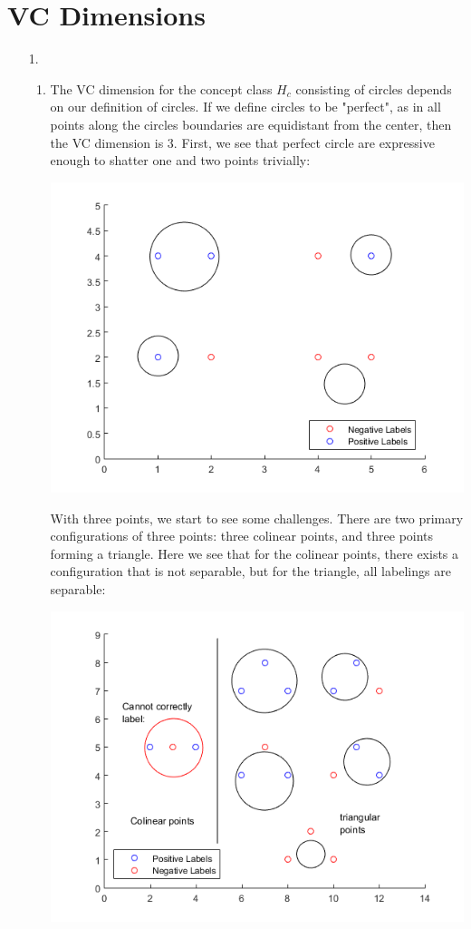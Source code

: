 \documentclass[11pt,a4paper]{article}
\begin{document}
	\section{VC Dimensions}
		\begin{itemize}
			\item [1.]
				\begin{enumerate} [label={\alph*)}]
					\item  The VC dimension for the concept class $H_c$ consisting of circles depends on our definition of circles. If we define circles to be "perfect", as in all points along the circles boundaries are equidistant from the center, then the VC dimension is 3. First, we see that perfect circle are expressive enough to shatter one and two points trivially:
					\begin{center}
						\includegraphics[width=1\linewidth]{q3a}
					\end{center}
					
					With three points, we start to see some challenges. There are two primary configurations of three points: three colinear points, and three points forming a triangle. Here we see that for the colinear points, there exists a configuration that is not separable, but for the triangle, all labelings are separable:
					\begin{center}
						\includegraphics[width=.75\linewidth]{q3a_2}
					\end{center}
					

\end{enumerate}
\end{itemize}
\end{document}
